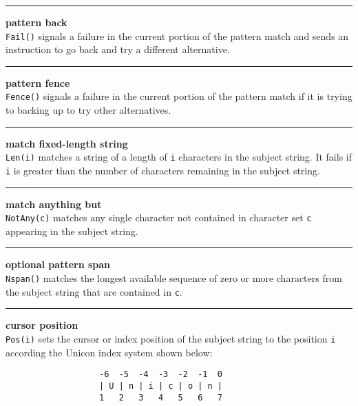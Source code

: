 \bigskip\hrule\vspace{0.1cm}
 \hfill{\bf pattern back}\\

\noindent
\texttt{Fail()} signals a failure in the current portion of the
pattern match and sends 
an instruction to go back and try a different alternative.\\


\bigskip\hrule\vspace{0.1cm}
 \hfill{\bf pattern fence}\\

\noindent
\texttt{Fence()} signals a failure in the current portion of the pattern match
if it is trying to backing up to try other alternatives.\\


\bigskip\hrule\vspace{0.1cm}
 \hfill{\bf match fixed-length string}\\

\noindent
\texttt{Len(i)} matches a string of a length of \texttt{i} characters
in the subject string.
It fails if \texttt{i} is greater than the number of characters remaining
in the subject string.\\


\bigskip\hrule\vspace{0.1cm}
 \hfill{\bf match anything but}\\

\noindent
\texttt{NotAny(c)} matches any single character not contained in
character set \texttt{c} appearing in the subject string.\\


\bigskip\hrule\vspace{0.1cm}
 \hfill{\bf optional pattern span}\\

\noindent
\texttt{Nspan()} matches the longest available sequence of zero or
more characters from the subject string that are contained in \texttt{c}.  \\


\bigskip\hrule\vspace{0.1cm}
 \hfill{\bf cursor position}\\

\noindent
\texttt{Pos(i)} sets the cursor or index position of the subject string to
the position \texttt{i} according the Unicon index system shown below:
\begin{verbatim}
                   -6  -5  -4  -3  -2  -1  0
                   | U | n | i | c | o | n |
                   1   2   3   4   5   6   7
\end{verbatim}


